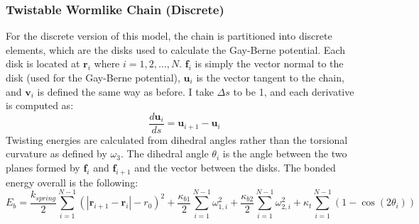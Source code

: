 \documentclass[11pt]{article}
\begin{document}
\subsubsection*{Twistable Wormlike Chain (Discrete)}

For the discrete version of this model, the chain is partitioned into discrete elements, which are the disks used to calculate the Gay-Berne potential. Each disk is located at $\textbf{r}_i$ where $i = 1,2,...,N$. $\textbf{f}_i$ is simply the vector normal to the disk (used for the Gay-Berne potential), $\textbf{u}_i$ is the vector tangent to the chain, and $\textbf{v}_i$ is defined the same way as before. I take $\Delta s$ to be 1, and each derivative is computed as:
\begin{equation*}
\frac{d\textbf{u}_i}{ds} = \textbf{u}_{i+1} - \textbf{u}_i
\end{equation*}
Twisting energies are calculated from dihedral angles rather than the torsional curvature as defined by $\omega_3$. The dihedral angle $\theta_i$ is the angle between the two planes formed by $\textbf{f}_i$ and $\textbf{f}_{i+1}$ and the vector between the disks. The bonded energy overall is the following:
\begin{equation*}
E_b = \frac{k_{spring}}{2} \sum_{i=1}^{N-1} \left( \left| \textbf{r}_{i+1} - \textbf{r}_i \right| - r_0\right)^2 
+ \frac{\kappa_{b1}}{2} \sum_{i=1}^{N-1} \omega_{1,i}^2 
+ \frac{\kappa_{b2}}{2} \sum_{i=1}^{N-1} \omega_{2,i}^2 
+ \kappa_{t} \sum_{i=1}^{N-1} \left( 1 - \cos\left(2\theta_i\right) \right) 
\end{equation*}
\end{document}
